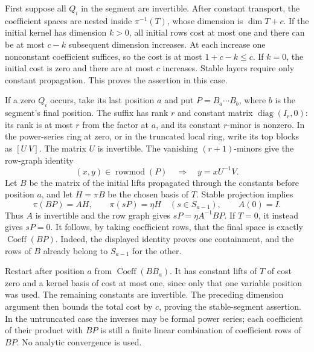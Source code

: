 \documentclass[11pt,a4paper]{article}
\theoremstyle{definition}\newtheorem{definition}{Definition}
\begin{document}
First suppose all $Q_i$ in the segment are invertible.
After constant transport, the coefficient spaces are nested
inside $\pi^{-1}(T)$, whose dimension is $\dim T+c$.
If the initial kernel has dimension $k>0$, all initial rows
cost at most one and there can be at most $c-k$ subsequent
dimension increases.  At each increase one nonconstant
coefficient suffices, so the cost is at most
$1+c-k\le c$.  If $k=0$, the initial cost is zero and
there are at most $c$ increases.  Stable layers require only
constant propagation.  This proves the assertion in this case.

If a zero $Q_i$ occurs, take its last position $a$ and put
$P=B_a\cdots B_b$, where $b$ is the segment's final position.
The suffix has rank $r$ and constant matrix
$\operatorname{diag}(I_r,0)$: its rank is at most $r$ from
the factor at $a$, and its constant $r$-minor is nonzero.
In the power-series ring at zero, or in the truncated local
ring, write its top blocks as $[U\ V]$.  The matrix $U$
is invertible.  The vanishing $(r+1)$-minors give the row-graph
identity
\[
 (x,y)\in\operatorname{rowmod}(P)
       \quad\Longrightarrow\quad y=xU^{-1}V.
\]
Let $B$ be the matrix of the initial lifts propagated through
the constants before position $a$, and let $H=\pi B$ be the
chosen basis of $T$.  Stable projection implies
\[
 \pi(BP)=AH,\qquad \pi(sP)=\eta H\quad(s\in S_{a-1}),
 \qquad A(0)=I.
\]
Thus $A$ is invertible and the row graph gives
$sP=\eta A^{-1}BP$.  If $T=0$, it instead gives $sP=0$.
It follows, by taking coefficient rows, that the final space
is exactly $\operatorname{Coeff}(BP)$.  Indeed, the displayed
identity proves one containment, and the rows of $B$ already
belong to $S_{a-1}$ for the other.

Restart after position $a$ from
$\operatorname{Coeff}(BB_a)$.  It has constant lifts of $T$
of cost zero and a kernel basis of cost at most one, since
only that one variable position was used.  The remaining
constants are invertible.  The preceding dimension argument
then bounds the total cost by $c$, proving the stable-segment
assertion.  In the untruncated case the inverses may be formal
power series; each coefficient of their product with $BP$
is still a finite linear combination of coefficient rows of
$BP$.  No analytic convergence is used.
\end{document}
